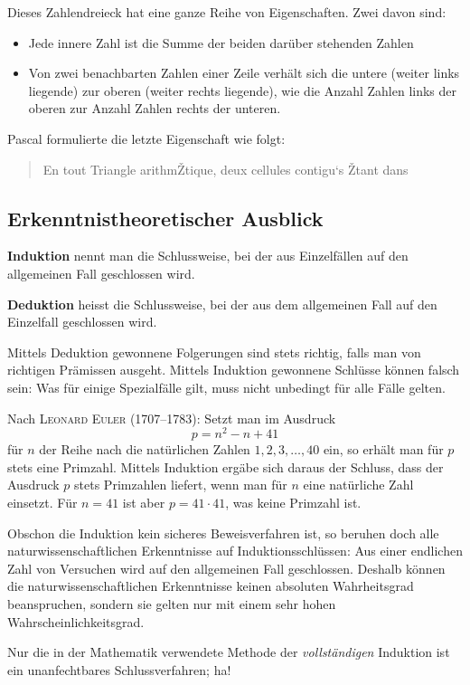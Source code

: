 \documentclass[%
11pt,%
twoside,%
titlepage,%
german,%
headsepline%
]{scrartcl}
\begin{document}
\noindent Dieses Zahlendreieck hat eine ganze Reihe von
Eigenschaften. Zwei davon sind:
\begin{itemize}
  \item Jede innere Zahl ist die Summe der beiden dar\"uber stehenden
  Zahlen
  \item Von zwei benachbarten Zahlen einer Zeile verh\"alt sich die
  untere (weiter links liegende) zur oberen (weiter rechts
  liegende), wie die Anzahl Zahlen links der oberen zur Anzahl
  Zahlen rechts der unteren. 
\end{itemize}

\noindent Pascal formulierte die letzte Eigenschaft wie folgt:
\begin{quote}
  En tout Triangle arithmŽtique, deux cellules contigu‘s Žtant dans
\end{quote}

\subsection{Erkenntnistheoretischer Ausblick}
\begin{cdef}[Induktion]{}
 \textbf{Induktion} nennt man die Schlussweise, bei der aus
  Einzelf\"allen auf den allgemeinen Fall geschlossen wird.
\end{cdef}
\begin{cdef}[Deduktion]{}
  \textbf{Deduktion} heisst die Schlussweise, bei der aus dem
  allgemeinen Fall auf den Einzelfall geschlossen wird.
\end{cdef}
Mittels Deduktion gewonnene Folgerungen sind stets richtig, falls
man von richtigen Pr\"amissen ausgeht. Mittels Induktion gewonnene
Schl\"usse k\"onnen falsch sein: Was f\"ur einige Spe\-zial\-f\"al\-le gilt, muss
nicht unbedingt f\"ur alle F\"alle gelten.
\begin{bsp}
  Nach \textsc{Leonard Euler} (1707--1783): Setzt man im Ausdruck
  $$p = n^2 - n +41$$
  f\"ur $n$ der Reihe nach die nat\"urlichen Zahlen $1,2,3,\dots,40$
  ein, so erh\"alt man f\"ur $p$ stets eine Primzahl. Mittels Induktion
  erg\"abe sich daraus der Schluss, dass der Ausdruck $p$ stets
  Primzahlen liefert, wenn man f\"ur $n$ eine nat\"urliche Zahl
  einsetzt. F\"ur $n=41$ ist aber $p=41\cdot41$, was keine Primzahl
  ist.
\end{bsp}
Obschon die Induktion kein sicheres Beweisverfahren ist, so beruhen
doch alle naturwissenschaftlichen Erkenntnisse auf
Induktionsschl\"ussen: Aus einer endlichen Zahl von Versuchen wird auf
den allgemeinen Fall geschlossen. Deshalb k\"onnen die
naturwissenschaftlichen Erkenntnisse keinen absoluten Wahrheitsgrad
beanspruchen, sondern sie gelten nur mit einem sehr hohen
Wahrscheinlichkeitsgrad.
\begin{bem}
  Nur die in der Mathematik verwendete Methode der
  \emph{vollst\"andigen} Induktion ist ein unanfechtbares
  Schlussverfahren; ha!
\end{bem}
\end{document}
